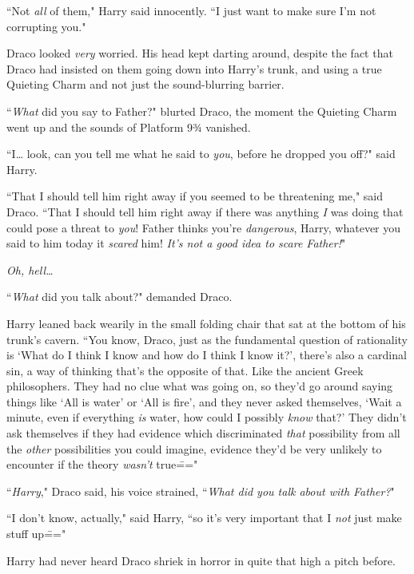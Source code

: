 ``Not \emph{all} of them," Harry said innocently. ``I just want to make sure I'm not corrupting you."

\later

Draco looked \emph{very} worried. His head kept darting around, despite the fact that Draco had insisted on them going down into Harry's trunk, and using a true Quieting Charm and not just the sound-blurring barrier.

``\emph{What} did you say to Father?" blurted Draco, the moment the Quieting Charm went up and the sounds of Platform 9¾ vanished.

``I{\ldots} look, can you tell me what he said to \emph{you}, before he dropped you off?" said Harry.

``That I should tell him right away if you seemed to be threatening me," said Draco. ``That I should tell him right away if there was anything \emph{I} was doing that could pose a threat to \emph{you}! Father thinks you're \emph{dangerous}, Harry, whatever you said to him today it \emph{scared} him! \emph{It's not a good idea to scare Father!}"

\emph{Oh, hell{\ldots}}

``\emph{What} did you talk about?" demanded Draco.

Harry leaned back wearily in the small folding chair that sat at the bottom of his trunk's cavern. ``You know, Draco, just as the fundamental question of rationality is `What do I think I know and how do I think I know it?', there's also a cardinal sin, a way of thinking that's the opposite of that. Like the ancient Greek philosophers. They had no clue what was going on, so they'd go around saying things like `All is water' or `All is fire', and they never asked themselves, `Wait a minute, even if everything \emph{is} water, how could I possibly \emph{know} that?' They didn't ask themselves if they had evidence which discriminated \emph{that} possibility from all the \emph{other} possibilities you could imagine, evidence they'd be very unlikely to encounter if the theory \emph{wasn't} true\==="

``\emph{Harry}," Draco said, his voice strained, ``\emph{What did you talk about with Father?}"

``I don't know, actually," said Harry, ``so it's very important that I \emph{not} just make stuff up\==="

Harry had never heard Draco shriek in horror in quite that high a pitch before.


